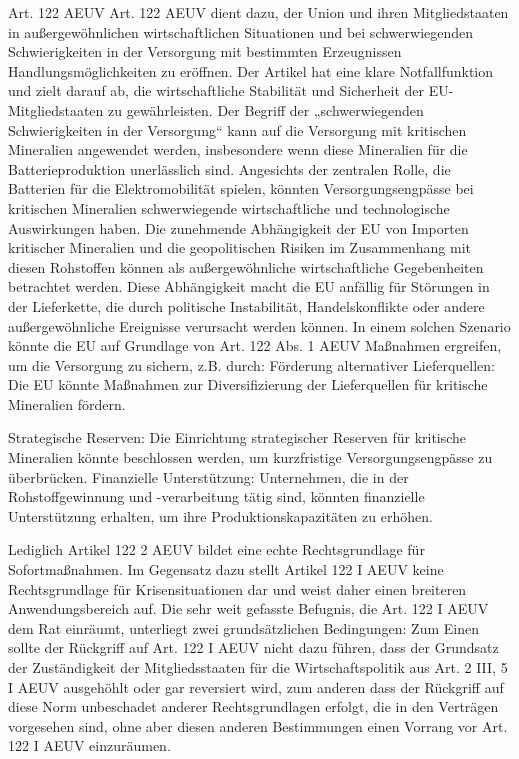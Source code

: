 \documentclass[12pt,a4paper,oneside]{book} %
\begin{document}
	
	
Art. 122 AEUV
Art. 122 AEUV dient dazu, der Union und ihren Mitgliedstaaten in außergewöhnlichen wirtschaftlichen Situationen und bei schwerwiegenden Schwierigkeiten in der Versorgung mit bestimmten Erzeugnissen Handlungsmöglichkeiten zu eröffnen. Der Artikel hat eine klare Notfallfunktion und zielt darauf ab, die wirtschaftliche Stabilität und Sicherheit der EU-Mitgliedstaaten zu gewährleisten. Der Begriff der „schwerwiegenden Schwierigkeiten in der Versorgung“ kann auf die Versorgung mit kritischen Mineralien angewendet werden, insbesondere wenn diese Mineralien für die Batterieproduktion unerlässlich sind. Angesichts der zentralen Rolle, die Batterien für die Elektromobilität spielen, könnten Versorgungsengpässe bei kritischen Mineralien schwerwiegende wirtschaftliche und technologische Auswirkungen haben. Die zunehmende Abhängigkeit der EU von Importen kritischer Mineralien und die geopolitischen Risiken im Zusammenhang mit diesen Rohstoffen können als außergewöhnliche wirtschaftliche Gegebenheiten betrachtet werden. Diese Abhängigkeit macht die EU anfällig für Störungen in der Lieferkette, die durch politische Instabilität, Handelskonflikte oder andere außergewöhnliche Ereignisse verursacht werden können.  In einem solchen Szenario könnte die EU auf Grundlage von Art. 122 Abs. 1 AEUV Maßnahmen ergreifen, um die Versorgung zu sichern, z.B. durch: Förderung alternativer Lieferquellen: Die EU könnte Maßnahmen zur Diversifizierung der Lieferquellen für kritische Mineralien fördern.

Strategische Reserven: Die Einrichtung strategischer Reserven für kritische Mineralien könnte beschlossen werden, um kurzfristige Versorgungsengpässe zu überbrücken. Finanzielle Unterstützung: Unternehmen, die in der Rohstoffgewinnung und -verarbeitung tätig sind, könnten finanzielle Unterstützung erhalten, um ihre Produktionskapazitäten zu erhöhen.
	
Lediglich Artikel 122 2 AEUV bildet eine echte Rechtsgrundlage für Sofortmaßnahmen. Im Gegensatz dazu stellt Artikel 122 I AEUV keine Rechtsgrundlage für Krisensituationen dar und weist daher einen breiteren Anwendungsbereich auf. Die sehr weit gefasste Befugnis, die Art. 122 I AEUV dem Rat einräumt, unterliegt zwei grundsätzlichen Bedingungen: Zum Einen sollte der Rückgriff auf Art. 122 I AEUV nicht dazu führen, dass der Grundsatz der Zuständigkeit der Mitgliedsstaaten für die Wirtschaftspolitik aus Art. 2 III, 5 I AEUV ausgehöhlt oder gar reversiert wird, zum anderen dass der Rückgriff auf diese Norm unbeschadet anderer Rechtsgrundlagen erfolgt, die in den Verträgen vorgesehen sind, ohne aber diesen anderen Bestimmungen einen Vorrang vor Art. 122 I AEUV einzuräumen.\autocite{chamon_anwendung_2023}
	
\end{document}
